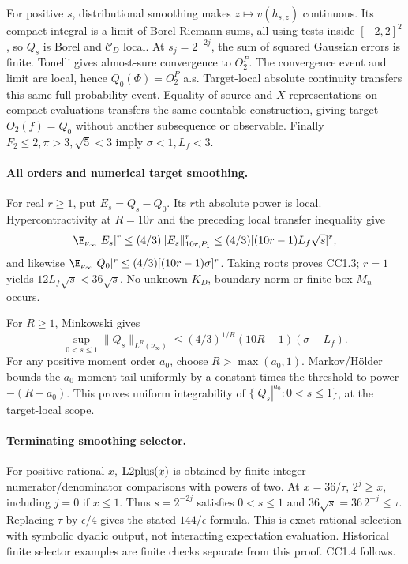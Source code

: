 For positive $s$, distributional smoothing makes $z\mapsto v(h_{s,z})$
continuous. Its compact integral is a limit of Borel Riemann sums, all
using tests inside $[-2,2]^2$, so $Q_s$ is Borel and $\mathcal C_D$ local.
At $s_j=2^{-2j}$, the sum of squared Gaussian errors is finite.
Tonelli gives almost-sure convergence to $O_2^P$. The convergence event
and limit are local, hence $Q_0(\Phi)=O_2^P$ a.s. Target-local absolute
continuity transfers this same full-probability event. Equality of source
and $X$ representations on compact evaluations transfers the same countable
construction, giving target $O_2(f)=Q_0$ without another subsequence or
observable. Finally $F_2\le2,\pi>3,\sqrt5<3$ imply $\sigma<1,L_f<3$.

\paragraph{All orders and numerical target smoothing.}
For real $r\ge1$, put $E_s=Q_s-Q_0$. Its $r$th absolute power is local.
Hypercontractivity at $R=10r$ and the preceding local transfer inequality
give
\[
 \E_{\nu_\infty}|E_s|^r
 \le(4/3)\|E_s\|_{10r,P_1}^r
 \le(4/3)[(10r-1)L_f\sqrt s]^r,
\]
and likewise
$\E_{\nu_\infty}|Q_0|^r\le(4/3)[(10r-1)\sigma]^r$.
Taking roots proves CC1.3; $r=1$ yields $12L_f\sqrt s<36\sqrt s$.
No unknown $K_D$, boundary norm or finite-box $M_n$ occurs.

For $R\ge1$, Minkowski gives
\[
 \sup_{0<s\le1}\|Q_s\|_{L^R(\nu_\infty)}
 \le(4/3)^{1/R}(10R-1)(\sigma+L_f).
\]
For any positive moment order $a_0$, choose $R>\max(a_0,1)$.
Markov/H\"older bounds the $a_0$-moment tail uniformly by a constant times
the threshold to power $-(R-a_0)$. This proves uniform integrability
of $\{|Q_s|^{a_0}:0<s\le1\}$, at the target-local scope.

\paragraph{Terminating smoothing selector.}
For positive rational $x$, $\operatorname{L2plus}(x)$ is obtained by finite integer
numerator/denominator comparisons with powers of two. At $x=36/\tau$,
$2^j\ge x$, including $j=0$ if $x\le1$. Thus $s=2^{-2j}$ satisfies
$0<s\le1$ and $36\sqrt s=36\,2^{-j}\le\tau$.
Replacing $\tau$ by $\epsilon/4$ gives the stated $144/\epsilon$ formula.
This is exact rational selection with symbolic dyadic output, not
interacting expectation evaluation. Historical finite selector examples
are finite checks separate from this proof. CC1.4 follows.

